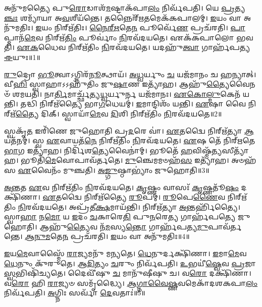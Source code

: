\setcounter{anuvakam}{0}

𑌅𑌨𑍁᳴𑌮𑌤𑍍𑌯𑍈 𑌪𑍁\-\ul{𑌰𑍋}\-𑌡𑌾𑌶᳴\-\ul{𑌮}\-𑌷𑍍𑌟𑌾\-𑌕᳴𑌪𑌾\-\ul{𑌲𑌂} 𑌨𑌿𑌰𑍍𑌵᳴𑌪𑌤𑌿।
𑌯𑍇 \ul{𑌪𑍍𑌰}\-𑌤𑍍𑌯\-\ul{𑌞𑍍𑌚𑌃} 𑌶𑌮𑍍𑌯𑌾᳴𑌯𑌾 𑌅\-\ul{𑌵}\-𑌶𑍀𑌯᳴𑌨𑍍𑌤𑍇।
𑌤𑌨𑍍𑌨𑍈𑌰𑍍᳴\-\ul{𑌋}\-𑌤𑌮𑍇𑌕᳴𑌕𑌪𑌾𑌲𑌮𑍍।
\-\ul{𑌇}\-𑌯𑌂 𑌵𑌾 𑌅𑌨𑍁᳴𑌮𑌤𑌿𑌃।
\-\ul{𑌇}\-𑌯𑌂 𑌨𑌿𑌰𑍍\mbox{}𑌋᳴𑌤𑌿𑌃।
\-\ul{𑌨𑍈}\-\-\ul{𑌰𑍍}\-\-\ul{𑌋}\-𑌤𑍇\-\ul{𑌨} 𑌪𑍂𑌰𑍍𑌵𑍇᳴\-\ul{𑌣} 𑌪𑍍𑌰𑌚᳴𑌰𑌤𑌿।
\-\ul{𑌪𑌾}\-𑌪𑍍𑌮𑌾𑌨᳴\-\ul{𑌮𑍇}\-𑌵 𑌨𑌿𑌰𑍍\mbox{}𑌋᳴\-\ul{𑌤𑌿𑌂} 𑌪𑍂𑌰𑍍𑌵𑌾𑌂॑ \ul{𑌨𑌿}\-𑌰𑌵᳴𑌦𑌯𑌤𑍇।
𑌏𑌕᳴𑌕𑌪𑌾𑌲𑍋 𑌭𑌵𑌤𑌿।
\-\ul{𑌏}\-\-\ul{𑌕}\-𑌧𑍈𑌵 𑌨𑌿𑌰𑍍\mbox{}𑌋᳴𑌤𑌿𑌂 \ul{𑌨𑌿}\-𑌰𑌵᳴𑌦𑌯𑌤𑍇।
𑌯𑌦𑌹𑍁᳴\-\ul{𑌤𑍍𑌵𑌾} 𑌗𑌾𑌰𑍍\mbox{}𑌹᳴𑌪𑌤𑍍𑌯 \ul{𑌈}\-𑌯𑍁𑌃॥1॥

\-\ul{𑌰𑍁}\-𑌦𑍍𑌰𑍋 \ul{𑌭𑍂}\-𑌤𑍍𑌵𑌾\-𑌽𑌗𑍍𑌨𑌿𑌰᳴\-\ul{𑌨𑍂}\-𑌤𑍍𑌥𑌾𑌯᳴।
\-\ul{𑌅}\-\-\ul{𑌧𑍍𑌵}\-𑌰𑍍𑌯𑍁𑌂 \ul{𑌚} 𑌯𑌜᳴𑌮𑌾𑌨𑌂 𑌚 𑌹𑌨𑍍𑌯𑌾𑌤𑍍।
𑌵𑍀\-\ul{𑌹𑌿} 𑌸𑍍𑌵𑌾𑌹𑌾\-𑌽𑌽𑌹𑍁᳴𑌤𑌿𑌂 𑌜𑍁\-\ul{𑌷𑌾}\-𑌣 𑌇𑌤𑍍𑌯𑌾᳴𑌹।
𑌆𑌹𑍁᳴\-\ul{𑌤𑍍𑌯𑍈}\-𑌵𑍈𑌨𑍞᳴ 𑌶𑌮𑌯𑌤𑌿।
𑌨𑌾\-\ul{𑌰𑍍𑌤𑌿}\-𑌮𑌾𑌰𑍍𑌚𑍍𑌛᳴𑌤𑍍𑌯\-\ul{𑌧𑍍𑌵}\-𑌰𑍍𑌯𑍁𑌰𑍍𑌨 𑌯𑌜᳴𑌮𑌾𑌨𑌃।
\-\ul{𑌏}\-\-\ul{𑌕𑍋}\-\-\ul{𑌲𑍍𑌮𑍁}\-𑌕𑍇𑌨᳴ 𑌯𑌨𑍍𑌤𑌿।
𑌤𑌦𑍍𑌧𑌿 𑌨𑌿𑌰𑍍\mbox{}𑌋᳴𑌤𑍍𑌯𑍈 𑌭𑌾\-\ul{𑌗}\-𑌧𑍇𑌯𑌮𑍍॑।
\-\ul{𑌇}\-𑌮𑌾𑌨𑍍𑌦𑌿𑌶𑌂᳴ 𑌯𑌨𑍍𑌤𑌿।
\-\ul{𑌏}\-𑌷𑌾 𑌵𑍈 𑌨𑌿𑌰𑍍\mbox{}𑌋᳴\-\ul{𑌤𑍍𑌯𑍈} 𑌦𑌿𑌕𑍍।
𑌸𑍍𑌵𑌾𑌯𑌾᳴\-\ul{𑌮𑍇}\-𑌵 \ul{𑌦𑌿}\-𑌶𑌿 𑌨𑌿𑌰𑍍\mbox{}𑌋᳴𑌤𑌿𑌂 \ul{𑌨𑌿}\-𑌰𑌵᳴𑌦𑌯𑌤𑍇॥2॥

𑌸𑍍𑌵𑌕𑍃᳴\-\ul{𑌤} 𑌇𑌰𑌿᳴𑌣𑍇 𑌜𑍁𑌹𑍋𑌤𑌿 𑌪𑍍𑌰\-\ul{𑌦}\-𑌰𑍇 𑌵𑌾॑।
\-\ul{𑌏}\-𑌤𑌦𑍍𑌵𑍈 𑌨𑌿𑌰𑍍\mbox{}𑌋᳴𑌤𑍍𑌯𑌾 \ul{𑌆}\-𑌯𑌤᳴𑌨𑌮𑍍।
𑌸𑍍𑌵 \ul{𑌏}\-𑌵𑌾𑌯𑌤᳴\-\ul{𑌨𑍇} 𑌨𑌿𑌰𑍍\mbox{}𑌋᳴𑌤𑌿𑌂 \ul{𑌨𑌿}\-𑌰𑌵᳴𑌦𑌯𑌤𑍇।
\-\ul{𑌏}\-𑌷 𑌤𑍇᳴ 𑌨𑌿𑌰𑍍‌\mbox{}𑌋𑌤𑍇 \ul{𑌭𑌾}\-𑌗 𑌇𑌤𑍍𑌯𑌾᳴𑌹।
𑌨𑌿𑌰𑍍𑌦𑌿᳴𑌶\-\ul{𑌤𑍍𑌯𑍇}\-𑌵𑍈𑌨𑌾॑𑌮𑍍।
𑌭𑍂𑌤𑍇᳴ \ul{𑌹}\-𑌵𑌿𑌷𑍍𑌮᳴\-\ul{𑌤𑍍𑌯}\-𑌸𑍀𑌤𑍍𑌯𑌾᳴𑌹।
𑌭𑍂𑌤𑌿᳴\-\ul{𑌮𑍇}\-𑌵𑍋𑌪𑌾𑌵᳴𑌰𑍍𑌤𑌤𑍇।
\-\ul{𑌮𑍁}\-𑌞𑍍𑌚𑍇𑌮𑌮𑍞𑌹᳴\-\ul{𑌸} 𑌇𑌤𑍍𑌯𑌾᳴𑌹।
𑌅𑍞𑌹᳴𑌸 \ul{𑌏}\-𑌵𑍈𑌨𑌂᳴ 𑌮𑍁𑌞𑍍𑌚𑌤𑌿।
\-\ul{𑌅}\-\-\ul{𑌙𑍍𑌗𑍁}\-𑌷𑍍𑌠𑌾𑌭𑍍𑌯𑌾𑌂॑ 𑌜𑍁𑌹𑍋𑌤𑌿॥3॥

\-\ul{𑌅}\-\-\ul{𑌨𑍍𑌤}\-𑌤 \ul{𑌏}\-𑌵 𑌨𑌿𑌰𑍍\mbox{}𑌋᳴𑌤𑌿𑌂 \ul{𑌨𑌿}\-𑌰𑌵᳴𑌦𑌯𑌤𑍇।
\-\ul{𑌕𑍃}\-𑌷𑍍𑌣𑌂 𑌵𑌾𑌸𑌃᳴ \ul{𑌕𑍃}\-𑌷𑍍𑌣𑌤𑍂᳴\-\ul{𑌷𑌂} 𑌦𑌕𑍍𑌷𑌿᳴𑌣𑌾।
\-\ul{𑌏}\-𑌤𑌦𑍍𑌵𑍈 𑌨𑌿𑌰𑍍\mbox{}𑌋᳴𑌤𑍍𑌯𑍈 \ul{𑌰𑍂}\-𑌪𑌮𑍍।
\-\ul{𑌰𑍂}\-𑌪𑍇\-\ul{𑌣𑍈}\-𑌵 𑌨𑌿𑌰𑍍\mbox{}𑌋᳴𑌤𑌿𑌂 \ul{𑌨𑌿}\-𑌰𑌵᳴𑌦𑌯𑌤𑍇।
𑌅𑌪𑍍𑌰᳴𑌤𑍀\-\ul{𑌕𑍍𑌷}\-𑌮𑌾𑌯᳴𑌨𑍍𑌤𑌿।
𑌨𑌿𑌰𑍍\mbox{}𑌋᳴𑌤𑍍𑌯𑌾 \ul{𑌅}\-𑌨𑍍𑌤𑌰𑍍\mbox{}𑌹𑌿᳴𑌤𑍍𑌯𑍈।
𑌸𑍍𑌵𑌾\-\ul{𑌹𑌾} 𑌨\-\ul{𑌮𑍋} 𑌯 \ul{𑌇}\-𑌦𑌂 \ul{𑌚}\-𑌕𑌾𑌰𑍇\-\ul{𑌤𑌿} 𑌪𑍁\-\ul{𑌨}\-𑌰𑍇\-\ul{𑌤𑍍𑌯} 𑌗𑌾𑌰𑍍\mbox{}𑌹᳴𑌪𑌤𑍍𑌯𑍇 𑌜𑍁𑌹𑍋𑌤𑌿।
𑌆𑌹𑍁᳴\-\ul{𑌤𑍍𑌯𑍈}\-𑌵 𑌨᳴\-\ul{𑌮}\-𑌸𑍍𑌯\-\ul{𑌨𑍍𑌤𑍋} 𑌗𑌾𑌰𑍍\mbox{}𑌹᳴𑌪𑌤𑍍𑌯\-\ul{𑌮𑍁}\-𑌪𑌾𑌵᳴𑌰𑍍𑌤𑌨𑍍𑌤𑍇।
\-\ul{𑌆}\-\-\ul{𑌨𑍁}\-\-\ul{𑌮}\-𑌤𑍇\-\ul{𑌨} 𑌪𑍍𑌰𑌚᳴𑌰𑌤𑌿।
\-\ul{𑌇}\-𑌯𑌂 𑌵𑌾 𑌅𑌨𑍁᳴𑌮𑌤𑌿𑌃॥4॥

\-\ul{𑌇}\-𑌯\-\ul{𑌮𑍇}\-𑌵𑌾𑌸𑍍𑌮𑍈᳴ \ul{𑌰𑌾}\-𑌜𑍍𑌯𑌮𑌨𑍁᳴ 𑌮𑌨𑍍𑌯𑌤𑍇।
\-\ul{𑌧𑍇}\-𑌨𑍁𑌰𑍍𑌦𑌕𑍍𑌷𑌿᳴𑌣𑌾।
\-\ul{𑌇}\-𑌮𑌾\-\ul{𑌮𑍇}\-𑌵 \ul{𑌧𑍇}\-𑌨𑍁𑌂 𑌕𑍁᳴𑌰𑍁𑌤𑍇।
\-\ul{𑌆}\-\-\ul{𑌦𑌿}\-𑌤𑍍𑌯𑌂 \ul{𑌚}\-𑌰𑍁𑌂 𑌨𑌿𑌰𑍍𑌵᳴𑌪𑌤𑌿।
\-\ul{𑌉}\-𑌭𑌯𑍀॑\-\ul{𑌷𑍍𑌵𑍇}\-𑌵 \ul{𑌪𑍍𑌰}\-𑌜𑌾\-\ul{𑌸𑍍𑌵}\-𑌭𑌿𑌷𑌿᳴𑌚𑍍𑌯𑌤𑍇।
𑌦𑍈𑌵𑍀᳴𑌷𑍁 \ul{𑌚} 𑌮𑌾𑌨𑍁᳴𑌷𑍀𑌷𑍁 𑌚।
𑌵\-\ul{𑌰𑍋} 𑌦𑌕𑍍𑌷𑌿᳴𑌣𑌾।
𑌵\-\ul{𑌰𑍋} 𑌹𑌿 \ul{𑌰𑌾}\-𑌜𑍍𑌯𑍞 𑌸𑌮𑍃᳴𑌦𑍍𑌧𑍍𑌯𑍈।
\-\ul{𑌆}\-\-\ul{𑌗𑍍𑌨𑌾}\-\-\ul{𑌵𑍈}\-\-\ul{𑌷𑍍𑌣}\-𑌵𑌮𑍇𑌕𑌾᳴\-𑌦𑌶\-𑌕𑌪𑌾\-\ul{𑌲𑌂} 𑌨𑌿𑌰𑍍𑌵᳴𑌪𑌤𑌿।
\-\ul{𑌅}\-𑌗𑍍𑌨𑌿𑌃 𑌸𑌰𑍍𑌵𑌾᳴ \ul{𑌦𑍇}\-𑌵𑌤𑌾𑌃॑॥5॥

